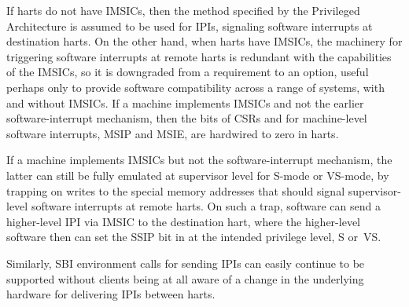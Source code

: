 If harts do not have IMSICs, then the method specified by the {\RISCV}
Privileged Architecture is assumed to be used for IPIs, signaling software
interrupts at destination harts.
On the other hand, when harts have IMSICs, the machinery for triggering
software interrupts at remote harts is redundant with the capabilities
of the IMSICs, so it is downgraded from a requirement to an option,
useful perhaps only to provide software compatibility across a range
of {\RISCV} systems, with and without IMSICs.
If a machine implements IMSICs and not the earlier software-interrupt
mechanism, then the bits of CSRs  and  for machine-level
software interrupts, MSIP and MSIE, are hardwired to zero in harts.

\begin{commentary}
If a machine implements IMSICs but not the software-interrupt
mechanism, the latter can still be fully emulated at supervisor level
for \mbox{S-mode} or \mbox{VS-mode}, by trapping on writes to the
special memory addresses that should signal supervisor-level software
interrupts at remote harts.
On such a trap, software can send a higher-level IPI via IMSIC to the
destination hart, where the higher-level software then can set the
SSIP bit in  at the intended privilege level, S or~VS.

Similarly, SBI environment calls for sending IPIs can easily continue to
be supported without clients being at all aware of a change in the
underlying hardware for delivering IPIs between harts.
\end{commentary}

